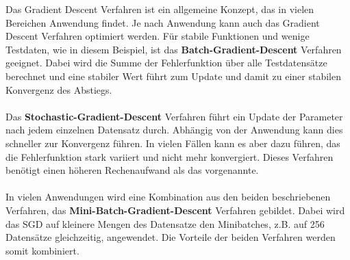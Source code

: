 \begin{enumerate}
Das Gradient Descent Verfahren ist ein allgemeine Konzept, das in vielen Bereichen Anwendung findet. Je nach Anwendung kann auch das Gradient Descent Verfahren optimiert werden. Für stabile Funktionen und wenige Testdaten, wie in diesem Beispiel, ist das \textbf{Batch-Gradient-Descent} Verfahren geeignet. Dabei wird die Summe der Fehlerfunktion über alle Testdatensätze berechnet und eine stabiler Wert führt zum Update und damit zu einer stabilen Konvergenz des Abstiegs.
\\\\
Das \textbf{Stochastic-Gradient-Descent} Verfahren führt ein Update der Parameter nach jedem einzelnen Datensatz durch. Abhängig von der Anwendung kann dies schneller zur Konvergenz führen. In vielen Fällen kann es aber dazu führen, das die Fehlerfunktion stark variiert und nicht mehr konvergiert. Dieses Verfahren benötigt einen höheren Rechenaufwand als das vorgenannte.
\\\\
In vielen Anwendungen wird eine Kombination aus den beiden beschriebenen Verfahren, das \textbf{Mini-Batch-Gradient-Descent} Verfahren gebildet.
Dabei wird das SGD auf kleinere Mengen des Datensatze den Minibatches, z.B. auf 256 Datensätze gleichzeitig, angewendet. Die Vorteile der beiden Verfahren werden somit kombiniert. 
    

\end{enumerate}

 
